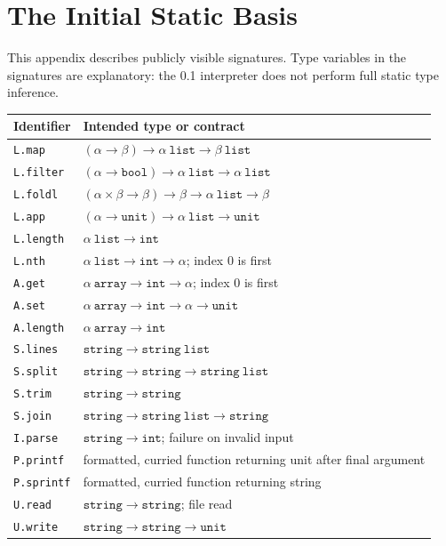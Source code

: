 \documentclass[11pt,oneside,openany]{book}
\newcommand{\kw}[1]{\texttt{#1}}
\begin{document}
\chapter{The Initial Static Basis}
\label{app:static}
This appendix describes publicly visible signatures. Type variables in the signatures are explanatory: the 0.1 interpreter does not perform full static type inference.
\small
\begin{longtable}{@{}p{}p{}@{}}
\toprule
Identifier & Intended type or contract \\
\midrule
\endhead
\kw{L.map} & $(\alpha\to\beta)\to\alpha\ \mathtt{list}\to\beta\ \mathtt{list}$\\
\kw{L.filter} & $(\alpha\to\mathtt{bool})\to\alpha\ \mathtt{list}\to\alpha\ \mathtt{list}$\\
\kw{L.foldl} & $(\alpha\times\beta\to\beta)\to\beta\to\alpha\ \mathtt{list}\to\beta$\\
\kw{L.app} & $(\alpha\to\mathtt{unit})\to\alpha\ \mathtt{list}\to\mathtt{unit}$\\
\kw{L.length} & $\alpha\ \mathtt{list}\to\mathtt{int}$\\
\kw{L.nth} & $\alpha\ \mathtt{list}\to\mathtt{int}\to\alpha$; index 0 is first\\
\kw{A.get} & $\alpha\ \mathtt{array}\to\mathtt{int}\to\alpha$; index 0 is first\\
\kw{A.set} & $\alpha\ \mathtt{array}\to\mathtt{int}\to\alpha\to\mathtt{unit}$\\
\kw{A.length} & $\alpha\ \mathtt{array}\to\mathtt{int}$\\
\kw{S.lines} & $\mathtt{string}\to\mathtt{string\ list}$\\
\kw{S.split} & $\mathtt{string}\to\mathtt{string}\to\mathtt{string\ list}$\\
\kw{S.trim} & $\mathtt{string}\to\mathtt{string}$\\
\kw{S.join} & $\mathtt{string}\to\mathtt{string\ list}\to\mathtt{string}$\\
\kw{I.parse} & $\mathtt{string}\to\mathtt{int}$; failure on invalid input\\
\kw{P.printf} & formatted, curried function returning unit after final argument\\
\kw{P.sprintf} & formatted, curried function returning string\\
\kw{U.read} & $\mathtt{string}\to\mathtt{string}$; file read\\
\kw{U.write} & $\mathtt{string}\to\mathtt{string}\to\mathtt{unit}$\\

\end{longtable}
\end{document}
